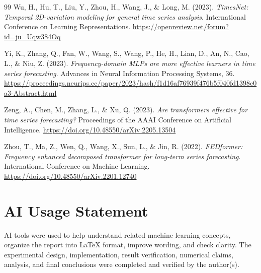 \documentclass[10pt]{article}
\begin{document}
\begin{thebibliography}{99}
Wu, H., Hu, T., Liu, Y., Zhou, H., Wang, J., \& Long, M. (2023).
\textit{TimesNet: Temporal 2D-variation modeling for general time series analysis}.
International Conference on Learning Representations.
\url{https://openreview.net/forum?id=ju_Uqw384Oq}

Yi, K., Zhang, Q., Fan, W., Wang, S., Wang, P., He, H., Lian, D., An, N., Cao, L., \& Niu, Z. (2023).
\textit{Frequency-domain MLPs are more effective learners in time series forecasting}.
Advances in Neural Information Processing Systems, 36.
\url{https://proceedings.neurips.cc/paper/2023/hash/f1d16af76939f476b5f040fd1398c0a3-Abstract.html}

Zeng, A., Chen, M., Zhang, L., \& Xu, Q. (2023).
\textit{Are transformers effective for time series forecasting?}
Proceedings of the AAAI Conference on Artificial Intelligence.
\url{https://doi.org/10.48550/arXiv.2205.13504}

Zhou, T., Ma, Z., Wen, Q., Wang, X., Sun, L., \& Jin, R. (2022).
\textit{FEDformer: Frequency enhanced decomposed transformer for long-term series forecasting}.
International Conference on Machine Learning.
\url{https://doi.org/10.48550/arXiv.2201.12740}

\end{thebibliography}

\section*{AI Usage Statement}

AI tools were used to help understand related machine learning concepts, organize the report into LaTeX format, improve wording, and check clarity. The experimental design, implementation, result verification, numerical claims, analysis, and final conclusions were completed and verified by the author(s).

\end{document}
